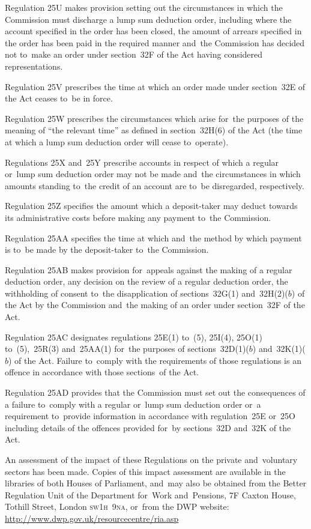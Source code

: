 \documentclass[12pt,a4paper]{article}
\begin{document}
Regulation 25U makes provision setting out the circumstances in which the Commission must discharge a lump sum deduction order, including where the account specified in the order has been closed, the amount of arrears specified in the order has been paid in the required manner and~the Commission has decided not to~make an order under section~32F of the Act having considered representations.

Regulation 25V prescribes the time at which an order made under section~32E of the Act ceases to~be in force.

Regulation 25W prescribes the circumstances which arise for~the purposes of the meaning of “the relevant time” as defined in section~32H(6) of the Act (the time at which a lump sum deduction order will cease to~operate).

Regulations 25X and~25Y prescribe accounts in respect of which a regular or~lump sum deduction order may not be made and~the circumstances in which amounts standing to~the credit of an account are to~be disregarded, respectively.

Regulation 25Z specifies the amount which a deposit-taker may deduct towards its administrative costs before making any payment to~the Commission.

Regulation 25AA specifies the time at which and~the method by which payment is to~be made by the deposit-taker to~the Commission.

Regulation 25AB makes provision for~appeals against the making of a regular deduction order, any decision on the review of a regular deduction order, the withholding of consent to~the disapplication of sections~32G(1) and~32H(2)($b$)  of the Act by the Commission and~the making of an order under section~32F of the Act.

\begin{sloppypar}
Regulation 25AC designates regulations 25E(1) to~(5), 25I(4), 25O(1) to~(5),~25R(3) and~25AA(1) for~the purposes of sections~32D(1)($b$)  and~32K(1)($b$)  of the Act. Failure to~comply with the requirements of those regulations is an offence in accordance with those sections~of the Act.
\end{sloppypar}

Regulation 25AD provides that the Commission must set out the consequences of a failure to~comply with a regular or~lump sum deduction order or~a requirement to~provide information in accordance with regulation~25E or~25O including details of the offences provided for~by sections~32D and~32K of the Act.

An assessment of the impact of these Regulations on the private and~voluntary sectors has been made. Copies of this impact assessment are available in the libraries of both Houses of Parliament, and~may also be obtained from the Better Regulation Unit of the Department for~Work and~Pensions, 7F Caxton House, Tothill Street, London \textsc{\lowercase{SW1H~9NA}}, or~from the DWP website: \url{http://www.dwp.gov.uk/resourcecentre/ria.asp}
\end{document}
